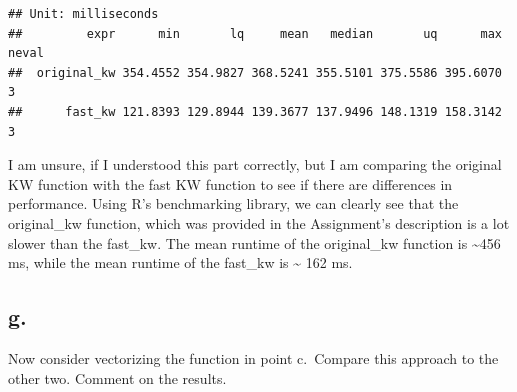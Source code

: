 \documentclass[
]{article}
\newenvironment{Shaded}{\begin{snugshade}}{\end{snugshade}}
\newcommand{\AttributeTok}[1]{\textcolor[rgb]{0.13,0.29,0.53}{#1}}
\newcommand{\ControlFlowTok}[1]{\textcolor[rgb]{0.13,0.29,0.53}{\textbf{#1}}}
\newcommand{\DecValTok}[1]{\textcolor[rgb]{0.00,0.00,0.81}{#1}}
\newcommand{\FunctionTok}[1]{\textcolor[rgb]{0.13,0.29,0.53}{\textbf{#1}}}
\newcommand{\NormalTok}[1]{#1}
\newcommand{\OtherTok}[1]{\textcolor[rgb]{0.56,0.35,0.01}{#1}}
\newcommand{\SpecialCharTok}[1]{\textcolor[rgb]{0.81,0.36,0.00}{\textbf{#1}}}
\newcommand{\StringTok}[1]{\textcolor[rgb]{0.31,0.60,0.02}{#1}}
\begin{document}
\begin{Shaded}
\end{Shaded}

\begin{verbatim}
## Unit: milliseconds
##         expr      min       lq     mean   median       uq      max neval
##  original_kw 354.4552 354.9827 368.5241 355.5101 375.5586 395.6070     3
##      fast_kw 121.8393 129.8944 139.3677 137.9496 148.1319 158.3142     3
\end{verbatim}

I am unsure, if I understood this part correctly, but I am comparing the
original KW function with the fast KW function to see if there are
differences in performance. Using R's benchmarking library, we can
clearly see that the original\_kw function, which was provided in the
Assignment's description is a lot slower than the fast\_kw. The mean
runtime of the original\_kw function is \textasciitilde456 ms, while the
mean runtime of the fast\_kw is \textasciitilde{} 162 ms.

\subsection{g.}\label{g.}

Now consider vectorizing the function in point c.~Compare this approach
to the other two. Comment on the results.
\end{document}
